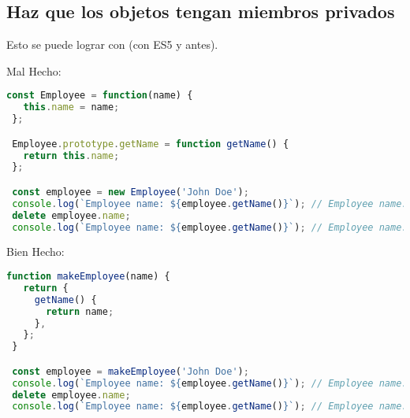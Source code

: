 \subsection*{Haz que los objetos tengan miembros privados}

Esto se puede lograr con  (con ES5 y antes).

Mal Hecho:
\begin{lstlisting}[language=TypeScript, style=badstyle]
 const Employee = function(name) {
   this.name = name;
 };

 Employee.prototype.getName = function getName() {
   return this.name;
 };

 const employee = new Employee('John Doe');
 console.log(`Employee name: ${employee.getName()}`); // Employee name: John Doe
 delete employee.name;
 console.log(`Employee name: ${employee.getName()}`); // Employee name: undefined
\end{lstlisting}
\vspace{0.5cm} %

Bien Hecho:
\begin{lstlisting}[language=TypeScript, style=goodstyle]
 function makeEmployee(name) {
   return {
     getName() {
       return name;
     },
   };
 }

 const employee = makeEmployee('John Doe');
 console.log(`Employee name: ${employee.getName()}`); // Employee name: John Doe
 delete employee.name;
 console.log(`Employee name: ${employee.getName()}`); // Employee name: John Doe
\end{lstlisting}
